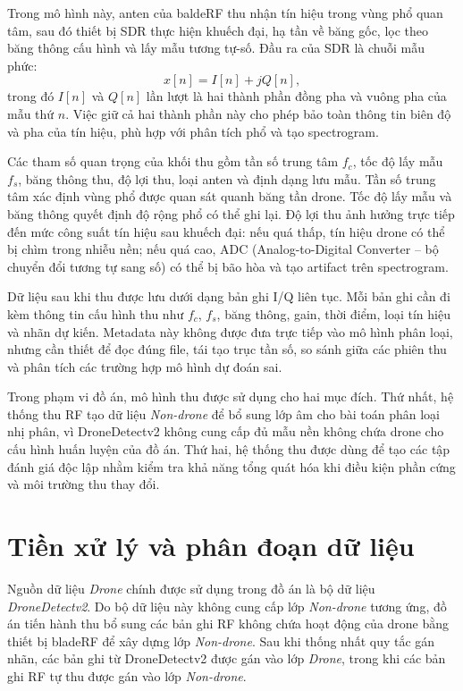 \documentclass[../DoAn.tex]{subfiles}
\begin{document}
Trong mô hình này, anten của baldeRF thu nhận tín hiệu trong vùng phổ quan tâm, sau đó thiết bị SDR thực hiện khuếch đại, hạ tần về băng gốc, lọc theo băng thông cấu hình và lấy mẫu tương tự-số. Đầu ra của SDR là chuỗi mẫu phức:
\begin{equation}
    x[n] = I[n] + jQ[n],
\end{equation}
trong đó $I[n]$ và $Q[n]$ lần lượt là hai thành phần đồng pha và vuông pha của mẫu thứ $n$. Việc giữ cả hai thành phần này cho phép bảo toàn thông tin biên độ và pha của tín hiệu, phù hợp với phân tích phổ và tạo spectrogram.

Các tham số quan trọng của khối thu gồm tần số trung tâm $f_c$, tốc độ lấy mẫu $f_s$, băng thông thu, độ lợi thu, loại anten và định dạng lưu mẫu. Tần số trung tâm xác định vùng phổ được quan sát quanh băng tần drone. Tốc độ lấy mẫu và băng thông quyết định độ rộng phổ có thể ghi lại. Độ lợi thu ảnh hưởng trực tiếp đến mức công suất tín hiệu sau khuếch đại: nếu quá thấp, tín hiệu drone có thể bị chìm trong nhiễu nền; nếu quá cao, ADC (Analog-to-Digital Converter – bộ chuyển đổi tương tự sang số) có thể bị bão hòa và tạo artifact trên spectrogram.

Dữ liệu sau khi thu được lưu dưới dạng bản ghi I/Q liên tục. Mỗi bản ghi cần đi kèm thông tin cấu hình thu như $f_c$, $f_s$, băng thông, gain, thời điểm, loại tín hiệu và nhãn dự kiến. Metadata này không được đưa trực tiếp vào mô hình phân loại, nhưng cần thiết để đọc đúng file, tái tạo trục tần số, so sánh giữa các phiên thu và phân tích các trường hợp mô hình dự đoán sai.

Trong phạm vi đồ án, mô hình thu được sử dụng cho hai mục đích. Thứ nhất, hệ thống thu RF tạo dữ liệu \textit{Non-drone} để bổ sung lớp âm cho bài toán phân loại nhị phân, vì DroneDetectv2 không cung cấp đủ mẫu nền không chứa drone cho cấu hình huấn luyện của đồ án. Thứ hai, hệ thống thu được dùng để tạo các tập đánh giá độc lập nhằm kiểm tra khả năng tổng quát hóa khi điều kiện phần cứng và môi trường thu thay đổi.

\section{Tiền xử lý và phân đoạn dữ liệu}

Nguồn dữ liệu \textit{Drone} chính được sử dụng trong đồ án là bộ dữ liệu \textit{DroneDetectv2}. Do bộ dữ liệu này không cung cấp lớp \textit{Non-drone} tương ứng, đồ án tiến hành thu bổ sung các bản ghi RF không chứa hoạt động của drone bằng thiết bị bladeRF để xây dựng lớp \textit{Non-drone}. Sau khi thống nhất quy tắc gán nhãn, các bản ghi từ DroneDetectv2 được gán vào lớp \textit{Drone}, trong khi các bản ghi RF tự thu được gán vào lớp \textit{Non-drone}.
\end{document}
